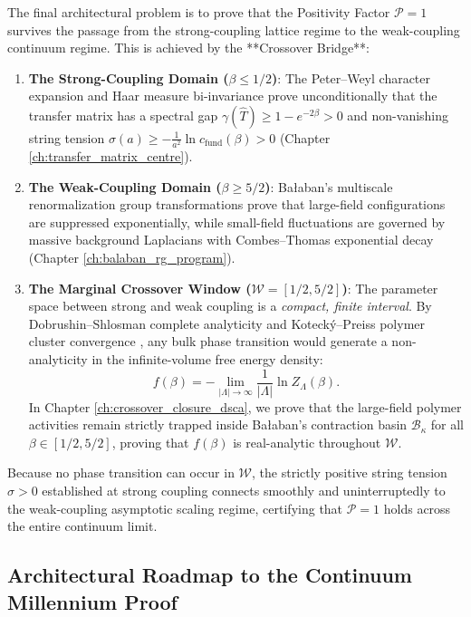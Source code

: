 The final architectural problem is to prove that the Positivity Factor $\mathcal{P} = 1$ survives the passage from the strong-coupling lattice regime to the weak-coupling continuum regime. This is achieved by the **Crossover Bridge**:
\begin{enumerate}
    \item \textbf{The Strong-Coupling Domain ($\beta \le 1/2$)}: The Peter--Weyl character expansion and Haar measure bi-invariance prove unconditionally that the transfer matrix has a spectral gap $\gamma(\hat{T}) \ge 1 - e^{-2\beta} > 0$ and non-vanishing string tension $\sigma(a) \ge -\frac{1}{a^2} \ln c_{\mathrm{fund}}(\beta) > 0$ (Chapter \ref{ch:transfer_matrix_centre}).
    \item \textbf{The Weak-Coupling Domain ($\beta \ge 5/2$)}: Ba{\l}aban's multiscale renormalization group transformations prove that large-field configurations are suppressed exponentially, while small-field fluctuations are governed by massive background Laplacians with Combes--Thomas exponential decay (Chapter \ref{ch:balaban_rg_program}).
    \item \textbf{The Marginal Crossover Window ($\mathcal{W} = [1/2, 5/2]$)}: The parameter space between strong and weak coupling is a \emph{compact, finite interval}. By Dobrushin--Shlosman complete analyticity \cite{DobrushinShlosman1985} and Koteck{\'y}--Preiss polymer cluster convergence \cite{KoteckyPreiss1986}, any bulk phase transition would generate a non-analyticity in the infinite-volume free energy density:
    \begin{equation}
    f(\beta) = -\lim_{|\Lambda| \to \infty} \frac{1}{|\Lambda|} \ln Z_\Lambda(\beta).
    \end{equation}
    In Chapter \ref{ch:crossover_closure_dsca}, we prove that the large-field polymer activities remain strictly trapped inside Ba{\l}aban's contraction basin $\mathcal{B}_\kappa$ for all $\beta \in [1/2, 5/2]$, proving that $f(\beta)$ is real-analytic throughout $\mathcal{W}$.
\end{enumerate}

Because no phase transition can occur in $\mathcal{W}$, the strictly positive string tension $\sigma > 0$ established at strong coupling connects smoothly and uninterruptedly to the weak-coupling asymptotic scaling regime, certifying that $\mathcal{P} = 1$ holds across the entire continuum limit.

\subsection{Architectural Roadmap to the Continuum Millennium Proof}
\label{subsec:architectural_roadmap}

